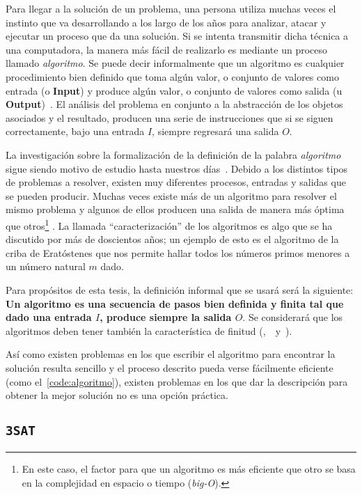 Para llegar a la solución de un problema, una persona utiliza muchas veces
el instinto que va desarrollando a los largo de los años para analizar,
atacar y ejecutar un proceso que da una solución. Si se intenta
transmitir dicha técnica a una computadora, la manera más fácil de realizarlo
es mediante un proceso llamado \textit{algoritmo}.
Se puede decir informalmente que un algoritmo es cualquier procedimiento bien
definido que toma algún valor, o conjunto de valores como entrada
(o \textbf{Input}) y produce algún valor, o conjunto de valores como
salida (u \textbf{Output})~\cite{Cormen}. El análisis del problema en conjunto
a la abstracción de los objetos asociados y el resultado, producen
una serie de instrucciones que si se siguen correctamente, bajo una entrada
$I$, siempre regresará una salida $O$.

La investigación sobre la formalización de la definición de la palabra
\textit{algoritmo} sigue siendo motivo de estudio hasta nuestros días~\cite{Buss}.
Debido a los distintos tipos de problemas a resolver, existen muy diferentes
procesos, entradas y salidas que se pueden producir. Muchas veces existe más
de un algoritmo para resolver el mismo problema y algunos de ellos producen una
salida de manera más óptima que otros\footnote{En este caso, el factor para
que un algoritmo es más eficiente que otro se basa en la complejidad
en espacio o tiempo (\textit{big-O}).} . La llamada ``caracterización'' de los algoritmos
es algo que se ha discutido por más de doscientos años; un ejemplo de esto
es el algoritmo de la criba de Eratóstenes que nos permite hallar todos los
números primos menores a un número natural $m$ dado.

Para propósitos de esta tesis, la definición informal que se usará será la
siguiente: \textbf{Un algoritmo es una secuencia de pasos bien definida y finita
  tal que dado una entrada $I$, produce siempre la salida $O$}. Se considerará
que los algoritmos deben tener también la característica de finitud
(\cite{Physics},~\cite{Rogers1967}~y~\cite{Cormen}).

Así como existen problemas en los que escribir el algoritmo para encontrar
la solución resulta sencillo y el proceso descrito pueda verse fácilmente
eficiente (como el~\cref{code:algoritmo}), existen problemas en los que
dar la descripción para obtener la mejor solución no es una opción práctica.

\subsection{\texttt{3SAT}}

